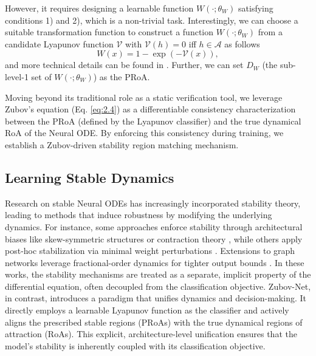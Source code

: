 \documentclass[journal]{IEEEtran}
\begin{document}
However, it requires designing a learnable function $W(\cdot; \theta_W)$ satisfying conditions 1) and 2), which is a non-trivial task. Interestingly, we can choose a suitable transformation function to construct a function $W(\cdot; \theta_W)$ from a candidate Lyapunov function $\mathcal{V}$ with $\mathcal{V}(h)=0$ iff $h \in \mathcal{A}$ as follows
\begin{equation} \label{eq:2.5}
	W\left( x \right) = 1 - \exp \left( { - \mathcal{V}\left( x \right)} \right),
\end{equation}
and more technical details can be found in \cite{liu2025physics,kang2023data}. Further, we can set $D_{W}$ (the sub-level-1 set of $W(\cdot;\theta_{W})$) as the PRoA.  

Moving beyond its traditional role as a static verification tool, we leverage Zubov's equation (Eq. \eqref{eq:2.4}) as a differentiable consistency characterization between the PRoA (defined by the Lyapunov classifier) and the true dynamical RoA of the Neural ODE. By enforcing this consistency during training, we establish a Zubov-driven stability region matching mechanism.


\subsection{Learning Stable Dynamics}
Research on stable Neural ODEs has increasingly incorporated stability theory, leading to methods that induce robustness by modifying the underlying dynamics. For instance, some approaches enforce stability through architectural biases like skew-symmetric structures \cite{pmlr-v145-huang22a} or contraction theory \cite{9809979}, while others apply post-hoc stabilization via minimal weight perturbations \cite{de2025improving}. Extensions to graph networks leverage fractional-order dynamics for tighter output bounds \cite{Kang_Zhao_Song_Xie_Zhao_Wang_She_Tay_2024,Cui_Kang_Li_Zhao_Tay_Deng_Li_2025} .  In these works, the stability mechanisms are treated as a separate, implicit property of the differential equation, often decoupled from the classification objective.  Zubov-Net, in contrast, introduces a paradigm that unifies dynamics and decision-making. It directly employs a learnable Lyapunov function as the classifier and actively aligns the prescribed stable regions (PRoAs) with the true dynamical regions of attraction (RoAs). This explicit, architecture-level unification ensures that the model's stability is inherently coupled with its classification objective.
\end{document}
